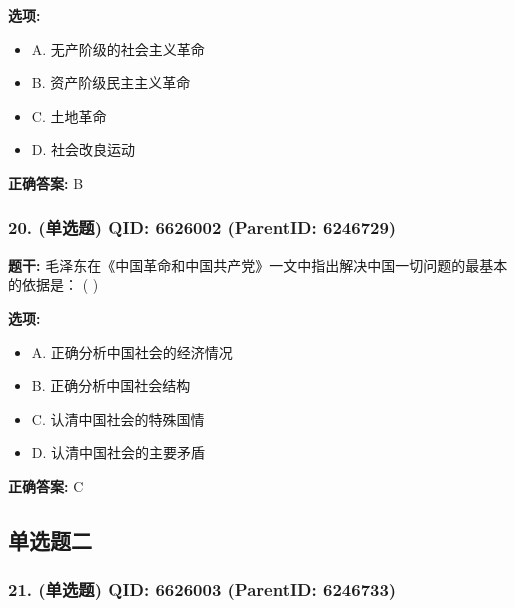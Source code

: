 \documentclass[12pt,UTF8]{ctexart}
\begin{document}
\textbf{选项:}
\begin{itemize}[leftmargin=*]

  \item A. 无产阶级的社会主义革命

  \item B. 资产阶级民主主义革命

  \item C. 土地革命

  \item D. 社会改良运动

\end{itemize}

\textbf{正确答案:}
B

\vspace{0.3em}\hrulefill\vspace{0.7em}

\subsubsection*{20. (单选题) \small QID: 6626002 (ParentID: 6246729)}

\textbf{题干:}
毛泽东在《中国革命和中国共产党》一文中指出解决中国一切问题的最基本的依据是： ( )



\textbf{选项:}
\begin{itemize}[leftmargin=*]

  \item A. 正确分析中国社会的经济情况

  \item B. 正确分析中国社会结构

  \item C. 认清中国社会的特殊国情

  \item D. 认清中国社会的主要矛盾

\end{itemize}

\textbf{正确答案:}
C

\vspace{0.3em}\hrulefill\vspace{0.7em}

\subsection*{单选题二}

\subsubsection*{21. (单选题) \small QID: 6626003 (ParentID: 6246733)}
\end{document}
